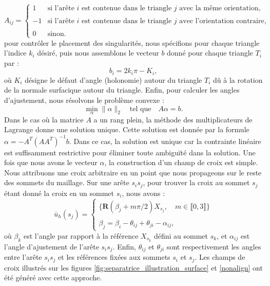 $$A_{ij} =
\begin{cases}
1 & \text{si l'arête } i \text{ est contenue dans le triangle } j \text{ avec la même orientation}, \\\\
-1 & \text{si l'arête } i \text{ est contenue dans le triangle } j \text{ avec l'orientation contraire}, \\\\
0 & \text{sinon}.
\end{cases}
$$
pour contrôler le placement des singularités, nous spécifions pour chaque triangle l'indice $k_i$ désiré, puis nous assemblons le vecteur $b$ donné pour chaque triangle $T_i$ par :
$$
b_i = 2k_i\pi-K_i,
$$
où $K_i$ désigne le défaut d'angle (holonomie) autour du triangle $T_i$ dû à la rotation de la normale surfacique autour du triangle. Enfin, pour calculer les angles d'ajustement, nous résolvons le problème convexe :
\[
\min_\alpha \|\alpha\|_2 \quad \text{tel que} \quad A\alpha = b.
\]
Dans le cas où la matrice $A$ a un rang plein, la méthode des multiplicateurs de Lagrange donne une solution unique. Cette solution est donnée par la formule $\alpha = -A^T (AA^T)^{-1} b$. Dans ce cas, la solution est unique car la contrainte linéaire est suffisamment restrictive pour éliminer toute ambiguïté dans la solution. Une fois que nous avons le vecteur $\alpha$, la construction d'un champ de croix est simple. Nous attribuons une croix arbitraire en un point que nous propageons sur le reste des sommets du maillage. Sur une arête $s_is_j$, pour trouver la croix au sommet $s_j$ étant donné la croix en un sommet $s_i$, nous avons :
$$
\bar{u}_h(s_j)=
\begin{cases}
\{\mathbf{R}(\beta_j+m\pi/2)X_{s_j},\quad m\in\llbracket0, 3\rrbracket\}\\\\
\beta_j = \beta_i - \theta_{ij} + \theta_{ji} - \alpha_{ij},
\end{cases}
$$
où $\beta_k$ est l'angle par rapport à la référence $X_{s_k}$ défini au sommet $s_k$, et $\alpha_{ij}$ est l'angle d'ajustement de l'arête $s_is_j$. Enfin, $\theta_{ij}$ et $\theta_{ji}$ sont respectivement les angles entre l'arête $s_is_j$ et les références fixées aux sommets $s_i$ et $s_j$. Les champs de croix illustrés sur les figures \ref{fig:separatrice_illustration_surface} et \ref{nonalign} ont été généré avec cette approche.


